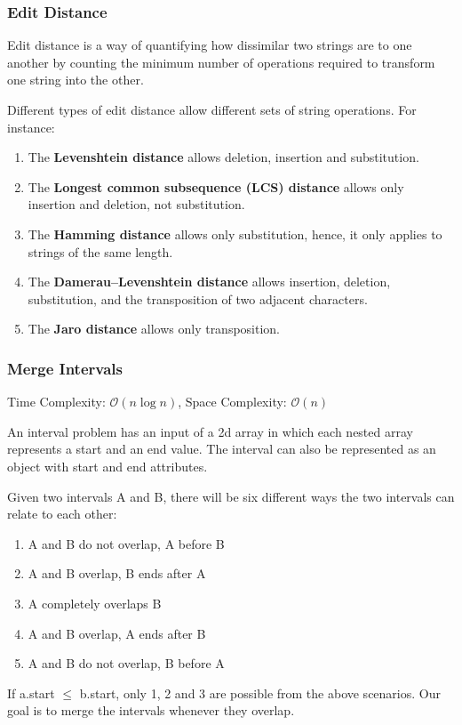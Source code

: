 \documentclass{article}
\newcommand{\bigO}{\mathcal{O}}
\begin{document}
    \subsubsection{Edit Distance}
    Edit distance is a way of quantifying how dissimilar two strings are to one another by counting the minimum number of operations required to transform one string into the other. 

    Different types of edit distance allow different sets of string operations. For instance:
    \begin{enumerate}
        \item The \textbf{Levenshtein distance} allows deletion, insertion and substitution.
        \item The \textbf{Longest common subsequence (LCS) distance} allows only insertion and deletion, not substitution.
        \item The \textbf{Hamming distance} allows only substitution, hence, it only applies to strings of the same length.
        \item The \textbf{Damerau–Levenshtein distance} allows insertion, deletion, substitution, and the transposition of two adjacent characters.
        \item The \textbf{Jaro distance} allows only transposition.
    \end{enumerate}

    \subsubsection{Merge Intervals}
    Time Complexity: $\bigO(n \log n)$, Space Complexity: $\bigO(n)$
    
    An interval problem has an input of a 2d array in which each nested array represents a start and an end value. The interval can also be represented as an object with start and end attributes.
    
    Given two intervals A and B, there will be six different ways the two intervals can relate to each other:
    \begin{enumerate}
        \item A and B do not overlap, A before B
        \item A and B overlap, B ends after A
        \item A completely overlaps B
        \item A and B overlap, A ends after B
        \item  A and B do not overlap, B before A
    \end{enumerate}
    If a.start $\leq$ b.start, only 1, 2 and 3 are possible from the above scenarios.  Our goal is to merge the intervals whenever they overlap.
    
\end{document}
